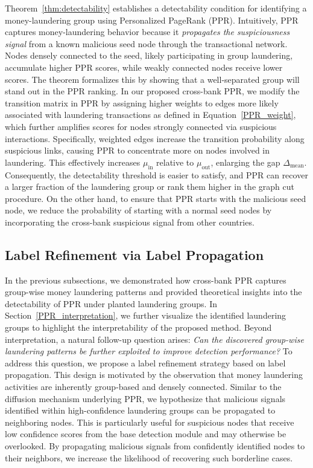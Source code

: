 Theorem~\ref{thm:detectability} establishes a detectability condition for identifying a money-laundering group using Personalized PageRank (PPR). Intuitively, PPR captures money-laundering behavior because it \emph{propagates the suspiciousness signal} from a known malicious seed node through the transactional network. Nodes densely connected to the seed, likely participating in group laundering, accumulate higher PPR scores, while weakly connected nodes receive lower scores. The theorem formalizes this by showing that a well-separated group will stand out in the PPR ranking.
In our proposed cross-bank PPR, we modify the transition matrix in PPR by assigning higher weights to edges more likely associated with laundering transactions as defined in Equation~\ref{PPR_weight}, which further amplifies scores for nodes strongly connected via suspicious interactions. Specifically, weighted edges increase the transition probability along suspicious links, causing PPR to concentrate more on nodes involved in laundering. This effectively increases \(\mu_{\mathrm{in}}\) relative to \(\mu_{\mathrm{out}}\), enlarging the gap \(\Delta_{\mathrm{mean}}\). Consequently, the detectability threshold is easier to satisfy, and PPR can recover a larger fraction of the laundering group or rank them higher in the graph cut procedure. On the other hand, to ensure that PPR starts with the malicious seed node, we reduce the probability of starting with a normal seed nodes by incorporating the cross-bank suspicious signal from other countries.


\subsection{Label Refinement via Label Propagation}
In the previous subsections, we demonstrated how cross-bank PPR captures group-wise money laundering patterns and provided theoretical insights into the detectability of PPR under planted laundering groups. In Section~\ref{PPR_interpretation}, we further visualize the identified laundering groups to highlight the interpretability of the proposed method. Beyond interpretation, a natural follow-up question arises: \emph{Can the discovered group-wise laundering patterns be further exploited to improve detection performance?} To address this question, we propose a label refinement strategy based on label propagation. This design is motivated by the observation that money laundering activities are inherently group-based and densely connected. Similar to the diffusion mechanism underlying PPR, we hypothesize that malicious signals identified within high-confidence laundering groups can be propagated to neighboring nodes. This is particularly useful for suspicious nodes that receive low confidence scores from the base detection module and may otherwise be overlooked. By propagating malicious signals from confidently identified nodes to their neighbors, we increase the likelihood of recovering such borderline cases.


